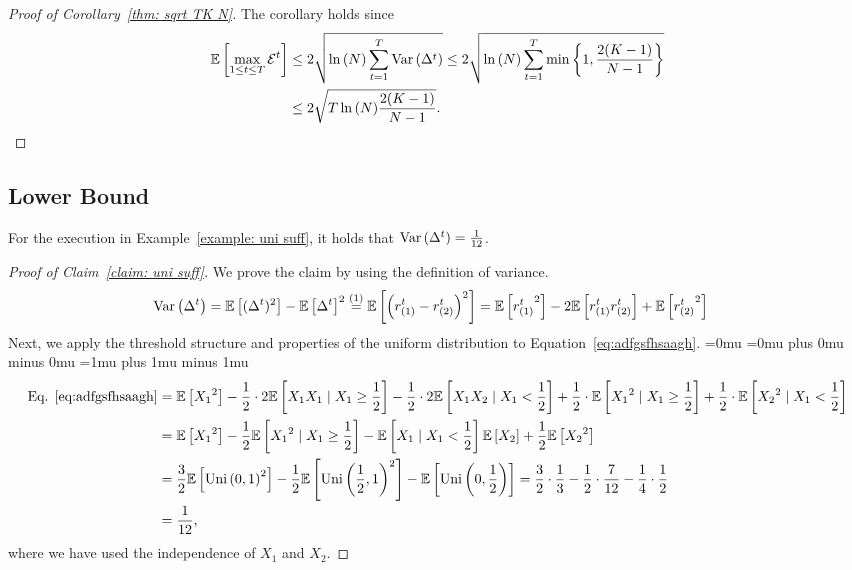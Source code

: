 \begin{proof}[Proof of Corollary~\ref{thm: sqrt TK N}]
The corollary holds since 
\begin{align*}
\mathbb{E}\left[ \max_{1\leq t \leq T} \mathcal{E}^t \right] &\leq
2\sqrt{\ln{(N)}\sum^T_{t=1}{\mathrm{Var}\left( {\Delta^t} \right)}}\leq 
2\sqrt{\ln{(N)}\sum^T_{t=1}{\min\left\{1,\frac{2(K-1)}{N-1} \right\}}}\\
&\leq 2\sqrt{T\ln{(N)}{\frac{2(K-1)}{N-1}}}.    
\end{align*}
\end{proof}

\subsection{Lower Bound}\label{appendix:lower bound}
\begin{claim}\label{claim: uni suff}
For the execution in Example~\ref{example: uni suff}, it holds that $\mathrm{Var}\left( {\Delta^t} \right) = \frac{1}{12}$.
\end{claim}
\begin{proof}[Proof of Claim~\ref{claim: uni suff}]
We prove the claim by using the definition of variance.
\begin{align}\label{eq:adfgsfhsaagh}
\mathrm{Var}\left( {\Delta^t} \right) & = \mathbb{E}\left[ ({{\Delta^t}})^2 \right]-\mathbb{E}\left[ {{\Delta^t}} \right]^2\overset{(1)}{=}\mathbb{E}\left[ \left(r_{(1)}^t - r_{(2)}^t\right)^2 \right] = \mathbb{E}\left[ {r_{(1)}^t}^2 \right] - 2\mathbb{E}\left[ r_{(1)}^tr_{(2)}^t \right] + \mathbb{E}\left[ {r_{(2)}^t}^2 \right]
\end{align}
Next, we apply the threshold structure and properties of the uniform distribution to Equation~\eqref{eq:adfgsfhsaagh}.
{\thinmuskip=0mu
\medmuskip=0mu plus 0mu minus 0mu
\thickmuskip=1mu plus 1mu minus 1mu
\begin{align*}
\textnormal{Eq. }\eqref{eq:adfgsfhsaagh} &= 
\mathbb{E}\left[ {X_1}^2 \right] - \frac{1}{2}\cdot 2\mathbb{E}\left[ X_1 X_1 \mid X_1 \geq \frac{1}{2} \right] - \frac{1}{2}\cdot 2\mathbb{E}\left[  X_1 X_2\mid X_1 < \frac{1}{2} \right]+ \frac{1}{2}\cdot \mathbb{E}\left[ {X_1}^2 \mid X_1 \geq \frac{1}{2} \right] + \frac{1}{2}\cdot \mathbb{E}\left[ {X_2}^2 \mid X_1 < \frac{1}{2} \right] \\
&=
\mathbb{E}\left[ {X_1}^2 \right] - \frac{1}{2} \mathbb{E}\left[ {X_1}^2 \mid X_1 \geq \frac{1}{2} \right] - \mathbb{E}\left[  X_1\mid X_1 < \frac{1}{2} \right] \mathbb{E}\left[  X_2 \right] + \frac{1}{2} \mathbb{E}\left[ {X_2}^2 \right]
\\&=
\frac{3}{2}\mathbb{E}\left[ {\text{Uni}\left(0,1\right)}^2 \right] - \frac{1}{2} \mathbb{E}\left[ {\text{Uni}\left(\frac{1}{2},1\right)}^2 \right] - \mathbb{E}\left[ \text{Uni}\left(0,\frac{1}{2}\right) \right]= \frac{3}{2} \cdot \frac{1}{3}- \frac{1}{2} \cdot \frac{7}{12} - \frac{1}{4} \cdot \frac{1}{2} \\
&= \frac{1}{12},
\end{align*}}%
where we have used the independence of $X_1$ and $X_2$.
\end{proof}


